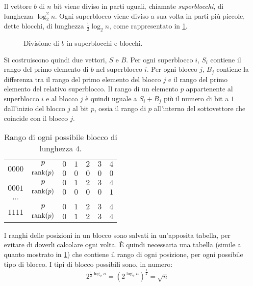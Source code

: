 Il vettore $b$ di $n$ bit viene diviso in parti uguali, chiamate \emph{superblocchi}, di lunghezza $\log_2^2 n$.
Ogni superblocco viene diviso a sua volta in parti più piccole, dette blocchi, di lunghezza $\frac{1}{2}\log_2 n$, come rappresentato in \cref{fig:jrank}.

\begin{figure}[ht]
	\centering
	
	\caption{Divisione di $b$ in superblocchi e blocchi.}
	\label{fig:jrank}
\end{figure}

Si costruiscono quindi due vettori, $S$ e $B$. Per ogni superblocco $i$, $S_i$ contiene il rango del primo elemento di $b$ nel superblocco $i$. Per ogni blocco $j$, $B_j$ contiene la differenza tra il rango del primo elemento del blocco $j$ e il rango del primo elemento del relativo superblocco. Il rango di un elemento $p$ appartenente al superblocco $i$ e al blocco $j$ è quindi uguale a $S_i+B_j$ più il numero di bit a $1$ dall'inizio del blocco $j$ al bit $p$, ossia il rango di $p$ all'interno del sottovettore che coincide con il blocco $j$.

\begin{table}
	\centering
	\begin{tabular}{|c|c|c|c|c|c|c|}
		\hline
		\multirow{2}{*}{$0000$} & $p$        & $0$ & $1$ & $2$ & $3$ & $4$ \\ \cline{2-7}
		                        & $\mathrm{rank}(p)$ & $0$ & $0$ & $0$ & $0$ & $0$ \\ \hline
		\multirow{2}{*}{$0001$} & $p$        & $0$ & $1$ & $2$ & $3$ & $4$ \\ \cline{2-7}
		                        & $\mathrm{rank}(p)$ & $0$ & $0$ & $0$ & $0$ & $1$ \\ \hline
		$\cdots$                &            &     &     &     &     &     \\ \hline
		\multirow{2}{*}{$1111$} & $p$        & $0$ & $1$ & $2$ & $3$ & $4$ \\ \cline{2-7}
		                        & $\mathrm{rank}(p)$ & $0$ & $1$ & $2$ & $3$ & $4$ \\ \hline
	\end{tabular}
	\caption{Rango di ogni possibile blocco di lunghezza $4$.}
	\label{table:example_rank_block4}
\end{table}

I ranghi delle posizioni in un blocco sono salvati in un'apposita tabella, per evitare di doverli calcolare ogni volta. È quindi necessaria una tabella (simile a quanto mostrato in \cref{table:example_rank_block4}) che contiene il rango di ogni posizione, per ogni possibile tipo di blocco. I tipi di blocco possibili sono, in numero:
\begin{equation*}
	2^{\frac{1}{2}\log_2 n} = \left(2^{\log_2 n}\right)^{\frac{1}{2}} = \sqrt{n}
\end{equation*}

